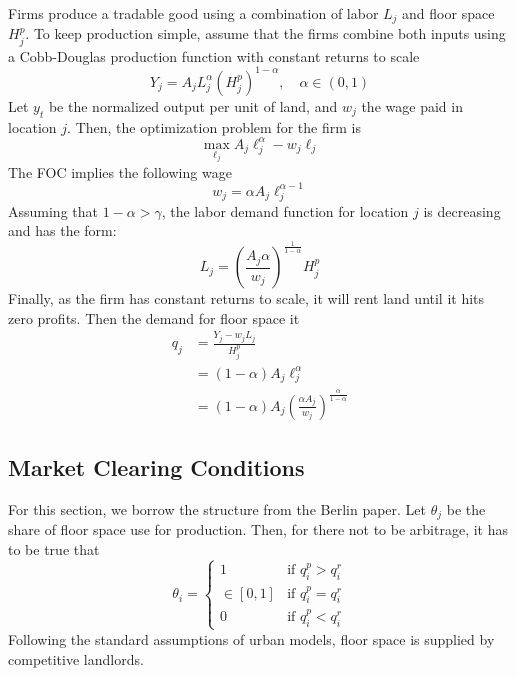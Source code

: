 \documentclass[12pt]{article}
\begin{document}
Firms produce a tradable good using a combination of labor $L_j$ and floor space $H_j^p$. To keep production simple, assume that the firms combine both inputs using a Cobb-Douglas production function with constant returns to scale
\begin{equation}
    Y_j = A_jL_j^\alpha \left(H_j^p\right)^{1-\alpha}, \quad\alpha\in(0,1)
\end{equation}
Let $y_t$ be the normalized output per unit of land, and $w_j$ the wage paid in location $j$. Then, the optimization problem for the firm is 
\begin{equation*}
    \max_{\ell_j} A_j\ell_j^\alpha - w_j\ell_j
\end{equation*}
The FOC implies the following wage
\begin{equation}
    w_j = \alpha A_j\ell_j^{\alpha-1}
\end{equation}
Assuming that $1-\alpha>\gamma$, the labor demand function for location $j$ is decreasing and has the form: 
\begin{equation*}
    L_j = \left(\frac{A_j\alpha}{w_j}\right)^{\frac{1}{1-\alpha}}H_j^p
\end{equation*}
Finally, as the firm has constant returns to scale, it will rent land until it hits zero profits. Then the demand for floor space it 
\begin{align*}
    q_j &= \frac{Y_j - w_jL_j}{H^p_j} \\ 
    &= (1-\alpha)A_j\ell_j^{\alpha} \\ 
    &= \boxed{(1-\alpha)A_j\left(\frac{\alpha A_j}{w_j}\right)^{\frac{\alpha}{1-\alpha}}}
\end{align*}

\subsection{Market Clearing Conditions}
For this section, we borrow the structure from the Berlin paper. Let $\theta_j$ be the share of floor space use for production. Then, for there not to be arbitrage, it has to be true that 
\begin{equation*}
    \theta_i = \begin{cases}
    1 &\mbox{if } q_i^p>q_i^r \\ 
    \in[0,1] &\mbox{if } q_i^p=q_i^r \\
    0 &\mbox{if } q_i^p<q_i^r 
    \end{cases}
\end{equation*}
Following the standard assumptions of urban models, floor space is supplied by competitive landlords. 
\end{document}
